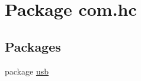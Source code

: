 \hypertarget{namespacecom_1_1hc}{}\section{Package com.\+hc}
\label{namespacecom_1_1hc}
\subsection*{Packages}
\begin{DoxyCompactItemize}
\item 
package \mbox{\hyperlink{namespacecom_1_1hc_1_1usb}{usb}}
\end{DoxyCompactItemize}
